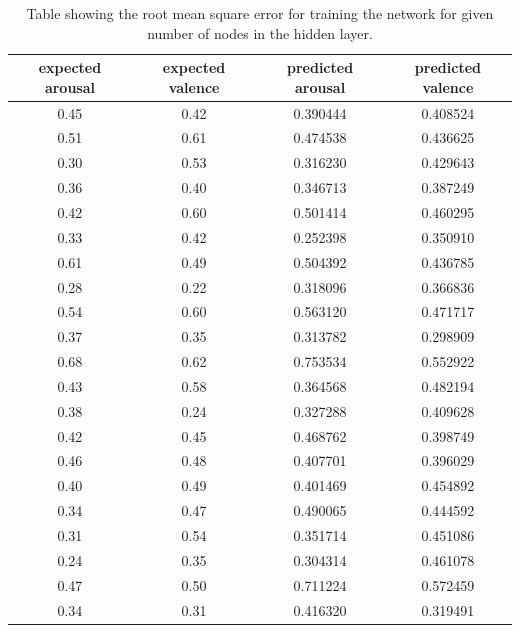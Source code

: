 \begin{table}
\begin{center}
\begin{tabular}{| c | c | c | c | } \hline 
 expected arousal & expected valence & predicted arousal & predicted valence \\ \hline \hline

0.45  & 	0.42  &  0.390444 &  0.408524  \\ \hline
0.51	&  0.61  &  0.474538 & 0.436625   \\ \hline
0.30  &  0.53  &  0.316230 & 0.429643   \\ \hline
0.36	&  0.40  &  0.346713 & 0.387249   \\ \hline
0.42	&  0.60  &  0.501414 & 0.460295   \\ \hline
0.33	&  0.42  &  0.252398 & 0.350910   \\ \hline
0.61	&  0.49  &  0.504392 & 0.436785   \\ \hline
0.28	&  0.22  &  0.318096 & 0.366836   \\ \hline
0.54	&  0.60  &  0.563120 & 0.471717   \\ \hline
0.37	&  0.35  &  0.313782 & 0.298909   \\ \hline
0.68  &  0.62  &  0.753534 & 0.552922   \\ \hline
0.43	&  0.58  &  0.364568 & 0.482194   \\ \hline
0.38	&  0.24  &  0.327288 & 0.409628   \\ \hline
0.42  &  0.45  &  0.468762 & 0.398749   \\ \hline
0.46  &  0.48  &  0.407701 & 0.396029   \\ \hline
0.40  &  0.49  &  0.401469 & 0.454892   \\ \hline
0.34  &  0.47  &  0.490065 & 0.444592   \\ \hline
0.31  &  0.54  &  0.351714 & 0.451086   \\ \hline
0.24  &  0.35  &  0.304314 & 0.461078   \\ \hline
0.47	&  0.50  &  0.711224 & 0.572459   \\ \hline
0.34	&  0.31  &  0.416320 & 0.319491   \\ \hline
\end{tabular}
\caption{Table showing the root mean square error for training the network for given number of nodes in the hidden layer.}
\label{table:rsmetablefinal}
\end{center}
\end{table}

\vspace{20pt}

